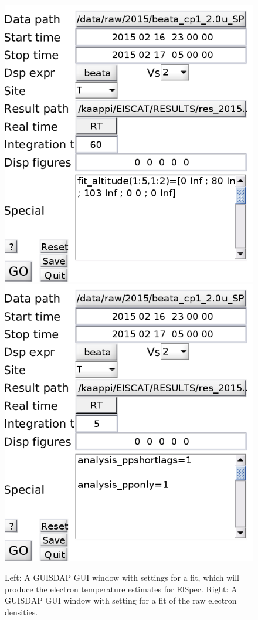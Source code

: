 \documentclass[12pt,a4paper]{report}
\begin{document}
\begin{figure}[ht]
\begin{center}
\includegraphics[width=.49\textwidth]{guisdap1.png}
\includegraphics[width=.49\textwidth]{guisdap2.png}
\caption{Left: A GUISDAP GUI window with settings for a fit, which will produce the electron temperature estimates for ElSpec. Right: A GUISDAP GUI window with setting for a fit of the raw electron densities.}
\label{figGUISDAP}
\end{center}
\end{figure}
\end{document}
